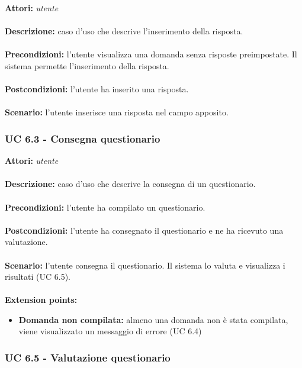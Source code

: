 \documentclass[a4paper,11pt]{article}
\begin{document}

\textbf{Attori:} \textit{utente}
\\ \\
\textbf{Descrizione:} caso d'uso che descrive l'inserimento della risposta.\\
\\
\textbf{Precondizioni:} l'utente visualizza una domanda senza risposte preimpostate. Il sistema permette l'inserimento della risposta.\\
\\
\textbf{Postcondizioni:} l'utente ha inserito una risposta.\\
\\
\textbf{Scenario:} l’utente inserisce una risposta nel campo apposito.\\


\subsubsection{UC 6.3 - Consegna questionario}

\textbf{Attori:} \textit{utente}
\\ \\
\textbf{Descrizione:} caso d'uso che descrive la consegna di un questionario.\\
\\
\textbf{Precondizioni:} l'utente ha compilato un questionario.\\
\\
\textbf{Postcondizioni:} l’utente ha consegnato il questionario e ne ha ricevuto una valutazione.\\
\\
\textbf{Scenario:} l’utente consegna il questionario. Il sistema lo valuta e visualizza i risultati (UC 6.5).\\
\\
\textbf{Extension points:} 
\begin{itemize}
	\item \textbf{Domanda non compilata:} almeno una domanda non  è stata compilata, viene visualizzato un messaggio di errore (UC 6.4)
\end{itemize}


\subsubsection{UC 6.5 - Valutazione questionario}
\end{document}
